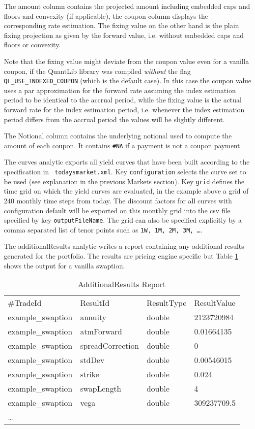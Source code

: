 {The amount column contains the projected amount including embedded caps and floors and convexity (if applicable), the
coupon column displays the corresponding rate estimation. The fixing value on the other hand is the plain fixing
projection as given by the forward value, i.e. without embedded caps and floors or convexity.

Note that the fixing value might deviate from the coupon value even for a vanilla coupon, if the QuantLib library was
compiled {\em without} the flag \verb+QL_USE_INDEXED_COUPON+ (which is the default case). In this case the coupon value
uses a par approximation for the forward rate assuming the index estimation period to be identical to the accrual
period, while the fixing value is the actual forward rate for the index estimation period, i.e. whenever the index estimation
period differs from the accrual period the values will be slightly different.

The Notional column contains the underlying notional used to compute the amount of each coupon. It contains \verb+#NA+
if a payment is not a coupon payment.

The curves analytic exports all yield curves that have been built according to the specification in {\tt
  todaysmarket.xml}. Key {\tt configuration} selects the curve set to be used (see explanation in the previous Markets
section).  Key {\tt grid} defines the time grid on which the yield curves are evaluated, in the example above a grid of
240 monthly time steps from today. The discount factors for all curves with configuration default will be exported on
this monthly grid into the csv file specified by key {\tt outputFileName}. The grid can also be specified explicitly by
a comma separated list of tenor points such as {\tt 1W, 1M, 2M, 3M, \dots}.

The additionalResults analytic writes a report containing any additional results generated for the portfolio. The results are pricing engine specific but Table \ref{additionalreport} shows the output for a vanilla swaption.

\begin{table}[hbt]
\scriptsize
\begin{center}
  \begin{tabular}{l|l|l|l}
\hline
\#TradeId & ResultId & ResultType & ResultValue \\
example\_swaption & annuity & double & 2123720984 \\
example\_swaption & atmForward & double & 0.01664135 \\
example\_swaption & spreadCorrection & double & 0 \\
example\_swaption & stdDev & double & 0.00546015 \\
example\_swaption & strike & double & 0.024 \\
example\_swaption & swapLength & double & 4 \\
example\_swaption & vega & double & 309237709.5 \\
\hline
\hline
\ldots
\end{tabular}
\caption{AdditionalResults Report}
\label{additionalreport}
\end{center}
\end{table}

}
